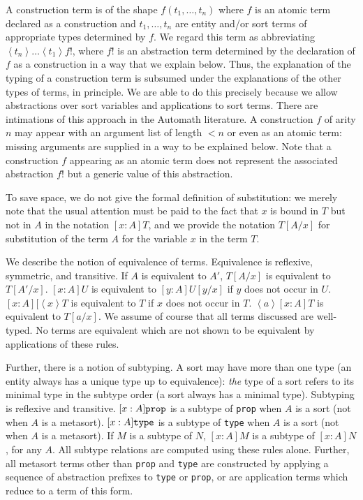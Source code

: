 \documentclass{article}
\begin{document}
A construction term is of the shape $f(t_1,\ldots,t_n)$ where $f$ is an atomic term declared as a construction and $t_1,\ldots,t_n$ are entity and/or sort terms of appropriate types determined by $f$.  We regard this term as abbreviating $\left<t_n\right>\ldots\left<t_1\right>f!$, where $f!$ is an abstraction term determined by the declaration of $f$ as a construction in a way that we explain below.  Thus, the explanation of the typing of a construction term is subsumed under the explanations of the other types of terms, in principle.  We are able to do this precisely because we allow abstractions over sort variables and applications to sort terms.  There are intimations of this approach in the Automath literature.  A construction $f$ of arity $n$ may appear with an argument list of length $<n$ or even as an atomic term:  missing arguments are supplied in a way to be explained below.  Note that a construction $f$ appearing as an atomic term does not represent the associated abstraction $f!$ but a generic value of this abstraction.

To save space, we do not give the formal definition of substitution:  we merely note that the usual attention must be paid to the fact that $x$ is bound in $T$ but not in $A$ in the notation $[x:A]T$, and we provide the notation $T[A/x]$ for substitution of the term $A$ for the variable $x$ in the term $T$.

We describe the notion of equivalence of terms.  Equivalence is reflexive, symmetric, and transitive.  If $A$ is equivalent to $A'$, $T[A/x]$ is equivalent to $T[A'/x]$.  $[x:A]U$ is equivalent to $[y:A]U[y/x]$ if $y$ does not occur in $U$.  $[x:A][\left<x\right>T$ is equivalent to $T$ if $x$ does not occur in $T$.
$\left<a\right>[x:A]T$ is equivalent to $T[a/x]$.  We assume of course that all terms discussed are well-typed.  No terms are equivalent which are not shown to be equivalent by applications of these rules.

Further, there is a notion of subtyping.  A sort may have more than one type (an entity always has a unique type up to equivalence):  {\em the\/} type of a sort refers to its minimal type in the subtype order (a sort always has a minimal type).  Subtyping is reflexive and transitive.  $[x:A]{\tt prop}$ is a subtype of {\tt prop} when $A$ is a sort (not when $A$ is a metasort).  $[x:A]{\tt type}$ is a subtype of {\tt type} when $A$ is a sort (not when $A$ is a metasort).  If $M$ is a subtype of $N$, $[x:A]M$ is a subtype of $[x:A]N$, for any $A$.  All subtype relations are computed using these rules alone.  Further, all metasort terms other than {\tt prop} and {\tt type} are constructed by applying a sequence of abstraction prefixes to
{\tt type} or {\tt prop}, or are application terms which reduce to a term of this form.
\end{document}
